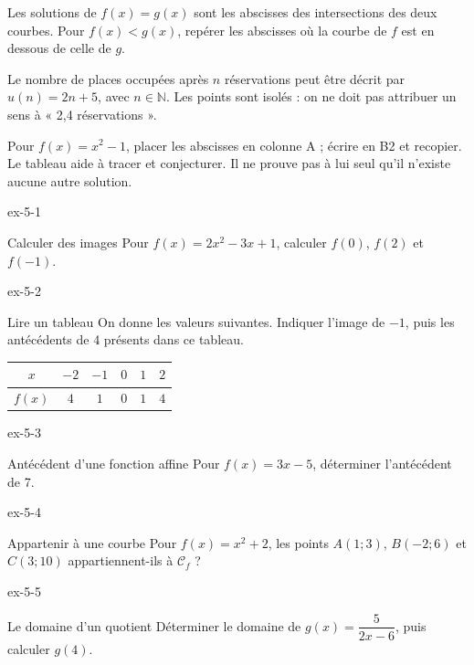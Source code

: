 \begin{propriete}Les solutions de $f(x)=g(x)$ sont les abscisses des intersections des deux courbes. Pour $f(x)<g(x)$, repérer les abscisses où la courbe de $f$ est en dessous de celle de $g$.\end{propriete}
\begin{exemple}Le nombre de places occupées après $n$ réservations peut être décrit par $u(n)=2n+5$, avec $n\in\mathbb N$. Les points sont isolés : on ne doit pas attribuer un sens à « 2,4 réservations ».\end{exemple}
Pour $f(x)=x^2-1$, placer les abscisses en colonne A ; écrire  en B2 et recopier. Le tableau aide à tracer et conjecturer. Il ne prouve pas à lui seul qu’il n’existe aucune autre solution.
\clearpage{}
\begin{blocLivre}{ex-5-1}
\begin{exercice}[1]{Calculer des images}
Pour $f(x)=2x^2-3x+1$, calculer $f(0)$, $f(2)$ et $f(-1)$.
\end{exercice}
\end{blocLivre}
\begin{blocLivre}{ex-5-2}
\begin{exercice}[1]{Lire un tableau}
On donne les valeurs suivantes. Indiquer l’image de $-1$, puis les antécédents de 4 présents dans ce tableau.\begin{center}\renewcommand{\arraystretch}{1.35}\begin{tabular}{c|ccccc}\toprule
$x$ & $-2$ & $-1$ & $0$ & $1$ & $2$\\\midrule
$f(x)$ & $4$ & $1$ & $0$ & $1$ & $4$\\
\bottomrule\end{tabular}\end{center}
\end{exercice}
\end{blocLivre}
\begin{blocLivre}{ex-5-3}
\begin{exercice}[1]{Antécédent d’une fonction affine}
Pour $f(x)=3x-5$, déterminer l’antécédent de 7.
\end{exercice}
\end{blocLivre}
\begin{blocLivre}{ex-5-4}
\begin{exercice}[1]{Appartenir à une courbe}
Pour $f(x)=x^2+2$, les points $A(1;3)$, $B(-2;6)$ et $C(3;10)$ appartiennent-ils à $\mathcal C_f$ ?
\label{fig-ex-5-4}
\end{exercice}
\end{blocLivre}
\begin{blocLivre}{ex-5-5}
\begin{exercice}[1]{Le domaine d’un quotient}
Déterminer le domaine de $g(x)=\dfrac{5}{2x-6}$, puis calculer $g(4)$.
\end{exercice}
\end{blocLivre}

